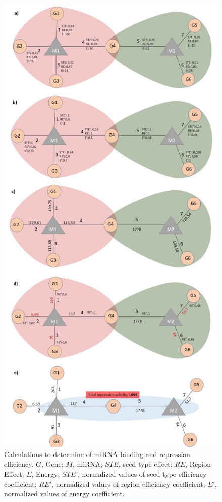 \documentclass[]{article}
\begin{document}
\begin{figure}
\hypertarget{fig2}{%
\centering
\includegraphics{fig2.jpg}
\caption{Calculations to determine of miRNA binding and repression
efficiency. \(G\), Gene; \(M\), miRNA; \(STE\), seed type effect;
\(RE\), Region Effect; \(E\), Energy; \(STE’\), normalized values of
seed type efficiency coefficient; \(RE’\), normalized values of region
efficiency coefficient; \(E’\), normalized values of energy
coefficient.}\label{fig2}
}
\end{figure}
\end{document}
